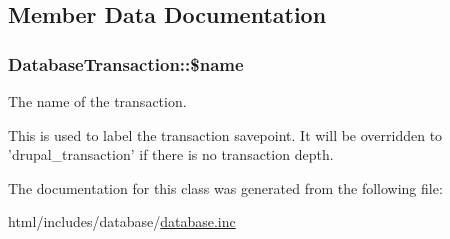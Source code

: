 \subsection{Member Data Documentation}
\hypertarget{classDatabaseTransaction_a70011229968a0f37f3a2be5ab72d03f6}{
\subsubsection[{\$name}]{\setlength{\rightskip}{0pt plus 5cm}DatabaseTransaction::\$name}}
\label{classDatabaseTransaction_a70011229968a0f37f3a2be5ab72d03f6}
The name of the transaction.

This is used to label the transaction savepoint. It will be overridden to 'drupal\_\-transaction' if there is no transaction depth. 

The documentation for this class was generated from the following file:\begin{DoxyCompactItemize}
\item 
html/includes/database/\hyperlink{database_8inc}{database.inc}\end{DoxyCompactItemize}
